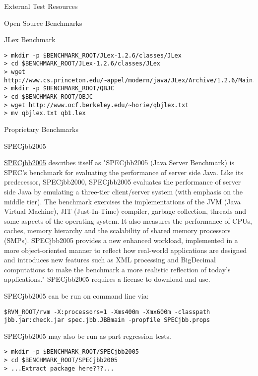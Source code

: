 \begin{section}{External Test Resources}
\begin{subsection}{Open Source Benchmarks}
\begin{subsubsection}{JLex Benchmark}
\begin{lstlisting}
> mkdir -p $BENCHMARK_ROOT/JLex-1.2.6/classes/JLex
> cd $BENCHMARK_ROOT/JLex-1.2.6/classes/JLex
> wget http://www.cs.princeton.edu/~appel/modern/java/JLex/Archive/1.2.6/Main.java
> mkdir -p $BENCHMARK_ROOT/QBJC
> cd $BENCHMARK_ROOT/QBJC
> wget http://www.ocf.berkeley.edu/~horie/qbjlex.txt
> mv qbjlex.txt qb1.lex
\end{lstlisting}

\end{subsubsection}

\end{subsection}

\begin{subsection}{Proprietary Benchmarks}

\begin{subsubsection}{SPECjbb2005}

\href{http://www.spec.org/jbb2005/}{SPECjbb2005} describes itself as "SPECjbb2005 (Java Server Benchmark) is SPEC's benchmark for evaluating the performance of server side Java. Like its predecessor, SPECjbb2000, SPECjbb2005 evaluates the performance of server side Java by emulating a three-tier client/server system (with emphasis on the middle tier). The benchmark exercises the implementations of the JVM (Java Virtual Machine), JIT (Just-In-Time) compiler, garbage collection, threads and some aspects of the operating system. It also measures the performance of CPUs, caches, memory hierarchy and the scalability of shared memory processors (SMPs). SPECjbb2005 provides a new enhanced workload, implemented in a more object-oriented manner to reflect how real-world applications are designed and introduces new features such as XML processing and BigDecimal computations to make the benchmark a more realistic reflection of today's applications." SPECjbb2005 requires a license to download and use.

SPECjbb2005 can be run on command line via:

\begin{lstlisting}
$RVM_ROOT/rvm -X:processors=1 -Xms400m -Xmx600m -classpath jbb.jar:check.jar spec.jbb.JBBmain -propfile SPECjbb.props
\end{lstlisting}

SPECjbb2005 may also be run as part regression tests.

\begin{lstlisting}
> mkdir -p $BENCHMARK_ROOT/SPECjbb2005
> cd $BENCHMARK_ROOT/SPECjbb2005
> ...Extract package here???...
\end{lstlisting}


\end{subsubsection}
\end{subsection}
\end{section}
